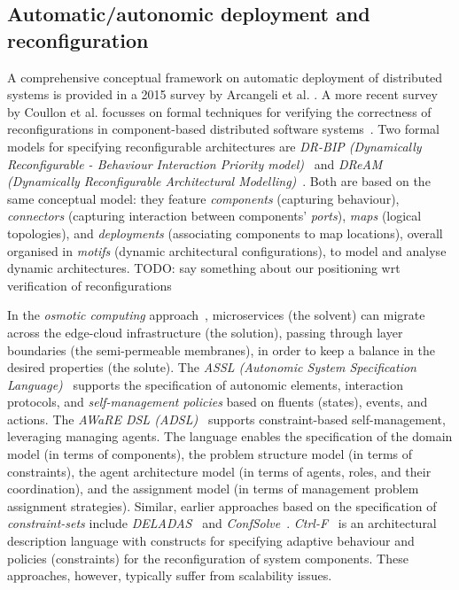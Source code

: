 \documentclass[conference]{IEEEtran}
\newcommand{\meta}[1]{{\color{blue}#1}}
\begin{document}
\subsection{Automatic/autonomic deployment and reconfiguration}
\label{sec:rw:autodep}
%
A comprehensive conceptual framework
 on automatic deployment of distributed systems
 is provided in a 2015 survey by Arcangeli et al. \cite{DBLP:journals/jss/ArcangeliBL15}.
%
A more recent survey by Coullon et al. focusses
 on formal techniques for verifying the correctness of reconfigurations
 in component-based distributed software systems~\cite{coullon2023swreconfig}.
%
Two formal models for specifying reconfigurable architectures are \emph{DR-BIP (Dynamically Reconfigurable - Behaviour Interaction Priority model)}~\cite{Ballouli18dr-bip}
and \emph{DReAM (Dynamically Reconfigurable Architectural Modelling)}~\cite{denicola2020dream-dynamic-reconfig-arch-modelling}.
%
Both are based on the same conceptual model: they 
 feature \emph{components} (capturing behaviour), \emph{connectors} (capturing interaction between components' \emph{ports}), 
\emph{maps} (logical topologies),
and \emph{deployments} (associating components to map locations),
overall organised in \emph{motifs} (dynamic architectural configurations),
to model and analyse dynamic architectures.
%
\meta{TODO: say something about our positioning wrt verification of reconfigurations}

In the \emph{osmotic computing} approach~\cite{DBLP:journals/computer/VillariFDRJR19},
 microservices (the solvent)
 can migrate across 
 the edge-cloud infrastructure (the solution),
 passing through layer boundaries (the semi-permeable membranes),
 in order to keep a balance in the desired properties (the solute).
%
The \emph{ASSL (Autonomic System Specification Language)}~\cite{DBLP:conf/birthday/VassevH97}
 supports the specification
 of autonomic elements,
 interaction protocols,
 and \emph{self-management policies} based on fluents (states), events, and actions.
%
%
The \emph{AWaRE DSL (ADSL)}~\cite{DBLP:conf/aswec/ChhetriLUVKNR18/adsl} supports constraint-based self-management, leveraging managing agents. The language enables the specification of the domain model (in terms of components), the problem structure model (in terms of constraints), the agent architecture model (in terms of agents, roles, and their coordination), and the assignment model (in terms of management problem assignment strategies).
%
Similar, earlier approaches based on the specification of \emph{constraint-sets} include \emph{DELADAS}~\cite{Dearle2004deladas}
and \emph{ConfSolve}~\cite{DBLP:conf/saso/HewsonAG13}.
%
\emph{Ctrl-F}~\cite{DBLP:journals/jss/AlvaresRS17}
 is an architectural description language
 with constructs for specifying adaptive behaviour 
 and policies (constraints) for the reconfiguration of system components.
%
These approaches, however, typically suffer from scalability issues.
\end{document}
